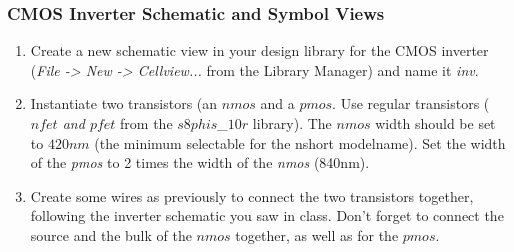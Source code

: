\subsubsection{CMOS Inverter Schematic and Symbol Views}	
\begin{enumerate}
	\item Create a new schematic view in your design library for the CMOS inverter (\textit{File -> New -> Cellview...} from the Library Manager) and name it \textit{inv}.
	\item Instantiate two transistors (an $nmos$ and a $pmos$. Use regular transistors (\textit{$nfet$ and $pfet$} from the \textit{$s8phis$\_$10r$} library). The $nmos$ width should be set to $420nm$ (the minimum selectable for the nshort modelname). Set the width of the \textit{pmos} to 2 times the width of the \textit{nmos} (840nm).
	\item Create some wires as previously to connect the two transistors together, following the inverter schematic you saw in class. Don't forget to connect the source and the bulk of the $nmos$ together, as well as for the $pmos$.
	
	
	

\end{enumerate}
